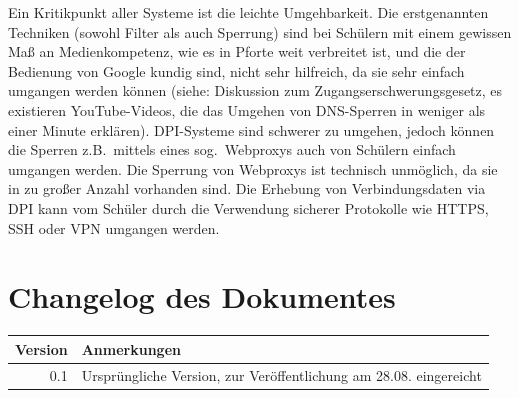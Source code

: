 \documentclass[10pt,a4paper,notitlepage]{scrartcl}
\begin{document}
\begin{multicols}{2}
Ein Kritikpunkt aller Systeme ist die leichte Umgehbarkeit. Die erstgenannten Techniken (sowohl Filter als auch Sperrung) sind bei Schülern mit einem gewissen Maß an Medienkompetenz, wie es in Pforte weit verbreitet ist, und die der Bedienung von Google kundig sind, nicht sehr hilfreich, da sie sehr einfach umgangen werden können (siehe: Diskussion zum \glqq Zugangserschwerungsgesetz\grqq, es existieren YouTube-Videos, die das Umgehen von DNS-Sperren in weniger als einer Minute erklären).
DPI-Systeme sind schwerer zu umgehen, jedoch können die Sperren z.B.\ mittels eines sog.\ Webproxys auch von Schülern einfach umgangen werden. Die Sperrung von Webproxys ist technisch unmöglich, da sie in zu großer Anzahl vorhanden sind. Die Erhebung von Verbindungsdaten via DPI kann vom Schüler durch die Verwendung sicherer Protokolle wie HTTPS, SSH oder VPN umgangen werden.
\end{multicols}
\newpage
\section*{Changelog des Dokumentes}
\begin{tabularx}{\textwidth}{r|l}
\textbf{Version}&\textbf{Anmerkungen}\\\hline
0.1&Ursprüngliche Version, zur Veröffentlichung am 28.08. eingereicht
\end{tabularx}
\end{document}
